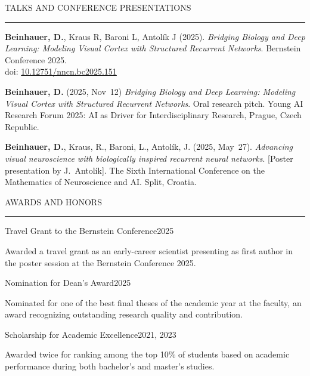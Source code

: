\documentclass{resume} %
\renewenvironment{rSection}[1]{
\sectionskip
\textcolor{CarnegieMellonRed}{\MakeUppercase{#1}}
\sectionlineskip
\hrule
\begin{list}{}{
\setlength{\leftmargin}{1.5em}
}
\item[]
}{
\end{list}
}
\begin{document}
\begin{rSection}{Talks and Conference Presentations}

\begin{enumerate}[leftmargin=*, label={[\arabic*]}] \itemsep -6pt

\item \textbf{Beinhauer, D.}, Kraus R, Baroni L, Antolík J (2025). \textit{Bridging Biology and Deep Learning: Modeling Visual Cortex with Structured Recurrent Networks}. Bernstein Conference 2025. \\doi: \href{https://abstracts.g-node.org/abstracts/02419eba-3746-41dc-b36c-f7832563d9f2}{10.12751/nncn.bc2025.151}
\item \textbf{Beinhauer, D.} (2025, Nov~12) \textit{Bridging Biology and Deep Learning: Modeling Visual Cortex with Structured Recurrent Networks}. Oral research pitch. Young AI Research Forum 2025: AI as Driver for Interdisciplinary Research, Prague, Czech Republic.
\item \textbf{Beinhauer, D.}, Kraus, R., Baroni, L., Antolík, J. (2025, May~27). 
\textit{Advancing visual neuroscience with biologically inspired recurrent neural networks}. [Poster presentation by J.~Antolík]. The Sixth International Conference on the Mathematics of Neuroscience and AI. Split, Croatia.

\end{enumerate}

\end{rSection}

\newpage

\begin{rSection}{Awards and Honors} \itemsep -2pt

\begin{rProject}{\large Travel Grant to the Bernstein Conference}{2025}{}{}
    \item Awarded a travel grant as an early-career scientist presenting as first author in the poster session at the Bernstein Conference 2025.
\end{rProject}

\begin{rProject}{\large Nomination for Dean's Award}{2025}{}{}
    \item Nominated for one of the best final theses of the academic year at the faculty, an award recognizing outstanding research quality and contribution.
\end{rProject}

\begin{rProject}{Scholarship for Academic Excellence}{2021, 2023}{}{}
    \item Awarded twice for ranking among the top 10\% of students based on academic performance during both bachelor's and master's studies.
\end{rProject}

\end{rSection}
\end{document}
